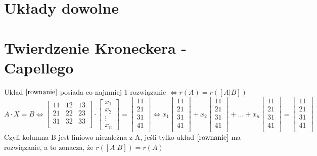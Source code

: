 \documentclass[11pt]{article}
\begin{document}
\section{Układy dowolne}
\section{Twierdzenie Kroneckera - Capellego}
Układ $\eqref{rownanie}$ posiada co najmniej 1 rozwiązanie $\iff r(A) = r([A|B])$ 
$$ A \cdot X = B \iff \begin{bmatrix}
	11 & 12 & 13 \\
	21 & 22 & 23 \\
	31 & 32 & 33 \\
\end{bmatrix} \cdot \begin{bmatrix}
	x_1\\
	x_2\\
	\vdots\\
	x_n
\end{bmatrix} = \begin{bmatrix}
	11\\
	21\\
	31\\
	41\\
\end{bmatrix} \iff x_1 \begin{bmatrix}
	11\\
	21\\
	31\\
	41\\
\end{bmatrix} + x_2 \begin{bmatrix}
	11\\
	21\\
	31\\
	41\\
\end{bmatrix} + \ldots + x_n \begin{bmatrix}
	11\\
	21\\
	31\\
	41\\
\end{bmatrix} = \begin{bmatrix}
	11\\
	21\\
	31\\
	41\\
\end{bmatrix}
$$
Czyli kolumna B jest liniowo niezależna z A, jeśli tylko układ $\eqref{rownanie}$ ma rozwiązanie, a to zonacza, że $r([A|B]) = r(A)$
\end{document}
